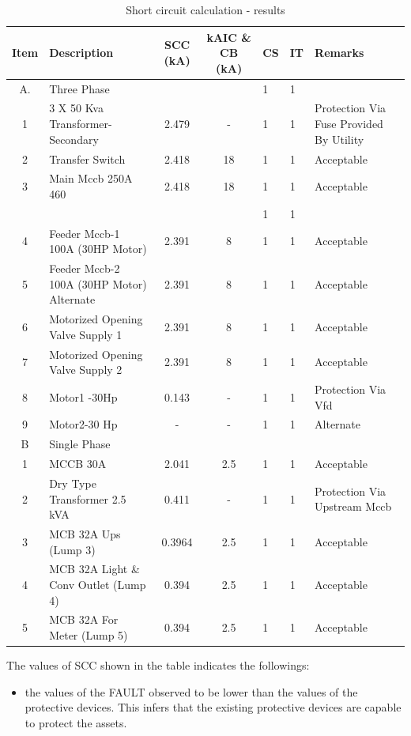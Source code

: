 \begin{table}[!htb]
	\caption{Short circuit calculation - results}
	\label{tbl_ch04_elecaudit_scc}
	{\scriptsize
		
	\begin{tabular}{c|p{4cm}|c|c|l|l|p{2.5cm}}
		\hline
		Item & Description & SCC (kA) & kAIC \& CB (kA) & CS &  IT  & Remarks  \\ 
		\hline
		A. & Three Phase &  &  & 1 & 1 &  \\ 
		1 & 3 X 50 Kva Transformer-Secondary & 2.479 &            - & 1 & 1 & Protection Via Fuse Provided By Utility \\ 
		2 & Transfer Switch & 2.418 & 18 & 1 & 1 &  Acceptable \\ 
		3 & Main Mccb 250A \@460 & 2.418 & 18 & 1 & 1 &  Acceptable \\ 
		&  &  &  & 1 & 1 &  \\ 
		4 & Feeder Mccb-1 100A (30HP Motor) & 2.391 & 8 & 1 & 1 &  Acceptable \\ 
		5 & Feeder Mccb-2 100A (30HP Motor) Alternate & 2.391 & 8 & 1 & 1 &  Acceptable \\ 
		6 & Motorized Opening Valve Supply 1 & 2.391 & 8 & 1 & 1 & Acceptable \\ 
		7 & Motorized Opening Valve Supply 2 & 2.391 & 8 & 1 & 1 & Acceptable \\ 
		8 & Motor1 -30Hp & 0.143 & - & 1 & 1 & Protection Via Vfd \\ 
		9 & Motor2-30 Hp & - & - & 1 & 1 & Alternate \\ 
		\hline
		B & Single Phase &  &  &  &  &  \\ 
		1 & MCCB 30A  & 2.041 & 2.5 & 1 & 1 & Acceptable \\ 
		2 & Dry Type Transformer 2.5 kVA & 0.411 & - & 1 & 1 & Protection Via Upstream  Mccb \\ 
		3 & MCB 32A Ups (Lump 3) & 0.3964 & 2.5 & 1 & 1 &  Acceptable \\ 
		4 & MCB 32A Light \& Conv Outlet (Lump 4) & 0.394 & 2.5 & 1 & 1 & Acceptable \\ 
		5 & MCB 32A For Meter (Lump 5) & 0.394 & 2.5 & 1 & 1 & Acceptable \\ 
		\hline
	\end{tabular}
	
		
	}%
\end{table}

The values of SCC shown in the table indicates the followings:

\begin{itemize}
\item the values of the FAULT observed to be lower than the values of the protective devices. This infers that the existing protective devices are capable to protect the assets.
\end{itemize}




